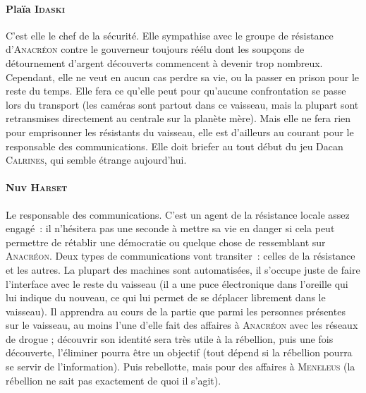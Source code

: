 {\paragraph{Plaïa \textsc{Idaski}}
{
C’est elle le chef de la sécurité.
Elle sympathise avec le groupe de résistance d’\textsc{Anacréon} contre le gouverneur toujours réélu dont les soupçons de détournement d’argent découverts commencent à devenir trop nombreux.
Cependant, elle ne veut en aucun cas perdre sa vie, ou la passer en prison pour le reste du temps.
Elle fera ce qu’elle peut pour qu’aucune confrontation se passe lors du transport (les caméras sont partout dans ce vaisseau, mais la plupart sont retransmises directement au centrale sur la planète mère).
Mais elle ne fera rien pour emprisonner les résistants du vaisseau, elle est d’ailleurs au courant pour le responsable des communications.
Elle doit briefer au tout début du jeu Dacan \textsc{Calrines}, qui semble étrange aujourd’hui.
}

\paragraph{Nuv \textsc{Harset}}
{
Le responsable des communications.
C’est un agent de la résistance locale assez engagé~: il n’hésitera pas une seconde à mettre sa vie en danger si cela peut permettre de rétablir une démocratie ou quelque chose de ressemblant sur \textsc{Anacréon}.
Deux types de communications vont transiter~: celles de la résistance et les autres.
La plupart des machines sont automatisées, il s’occupe juste de faire l’interface avec le reste du vaisseau (il a une puce électronique dans l’oreille qui lui indique du nouveau, ce qui lui permet de se déplacer librement dans le vaisseau).
Il apprendra au cours de la partie que parmi les personnes présentes sur le vaisseau, au moins l’une d’elle fait des affaires à \textsc{Anacréon} avec les réseaux de drogue ; découvrir son identité sera très utile à la rébellion, puis une fois découverte, l’éliminer pourra être un objectif (tout dépend si la rébellion pourra se servir de l’information).
Puis rebellotte, mais pour des affaires à \textsc{Meneleus} (la rébellion ne sait pas exactement de quoi il s’agit).
}

}
